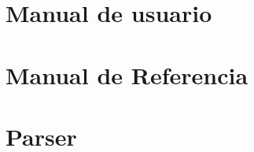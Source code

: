 
\section{Manual de usuario}

\label{appendix:usermanual}

\section{Manual de Referencia}

\label{appendix:vmref}

\section{Parser}
\label{appendix:parser}


